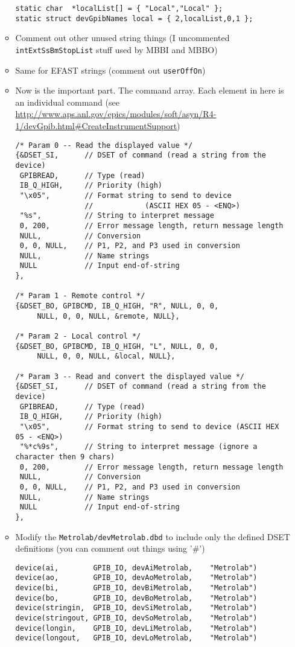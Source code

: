\documentclass[11pt]{article}
\begin{document}
\begin{enumerate}
\begin{itemize}
\begin{verbatim}
static char  *localList[] = { "Local","Local" };
static struct devGpibNames local = { 2,localList,0,1 };
\end{verbatim}
\item Comment out other unused string things (I uncommented
      \verb~intExtSsBmStopList~ stuff used by MBBI and MBBO)
\item Same for EFAST strings (comment out \verb~userOffOn~)
\item Now is the important part. The command array. Each element in
here is an individual command
(see \url{http://www.aps.anl.gov/epics/modules/soft/asyn/R4-1/devGpib.html#CreateInstrumentSupport})
\begin{verbatim}
/* Param 0 -- Read the displayed value */
{&DSET_SI,      // DSET of command (read a string from the device)
 GPIBREAD,      // Type (read)
 IB_Q_HIGH,     // Priority (high)
 "\x05",        // Format string to send to device 
                //            (ASCII HEX 05 - <ENQ>)
 "%s",          // String to interpret message
 0, 200,        // Error message length, return message length
 NULL,          // Conversion
 0, 0, NULL,    // P1, P2, and P3 used in conversion
 NULL,          // Name strings
 NULL           // Input end-of-string
},

/* Param 1 - Remote control */
{&DSET_BO, GPIBCMD, IB_Q_HIGH, "R", NULL, 0, 0, 
     NULL, 0, 0, NULL, &remote, NULL},

/* Param 2 - Local control */
{&DSET_BO, GPIBCMD, IB_Q_HIGH, "L", NULL, 0, 0, 
     NULL, 0, 0, NULL, &local, NULL},

/* Param 3 -- Read and convert the displayed value */
{&DSET_SI,      // DSET of command (read a string from the device)
 GPIBREAD,      // Type (read)
 IB_Q_HIGH,     // Priority (high)
 "\x05",        // Format string to send to device (ASCII HEX 05 - <ENQ>)
 "%*c%9s",      // String to interpret message (ignore a character then 9 chars)
 0, 200,        // Error message length, return message length
 NULL,          // Conversion
 0, 0, NULL,    // P1, P2, and P3 used in conversion
 NULL,          // Name strings
 NULL           // Input end-of-string
},
\end{verbatim}
\item Modify the \verb~Metrolab/devMetrolab.dbd~ to include only the
defined DSET definitions (you can comment out things using '\#')
\begin{verbatim}
device(ai,        GPIB_IO, devAiMetrolab,    "Metrolab")
device(ao,        GPIB_IO, devAoMetrolab,    "Metrolab")
device(bi,        GPIB_IO, devBiMetrolab,    "Metrolab")
device(bo,        GPIB_IO, devBoMetrolab,    "Metrolab")
device(stringin,  GPIB_IO, devSiMetrolab,    "Metrolab")
device(stringout, GPIB_IO, devSoMetrolab,    "Metrolab")
device(longin,    GPIB_IO, devLiMetrolab,    "Metrolab")
device(longout,   GPIB_IO, devLoMetrolab,    "Metrolab")


\end{verbatim}
\end{itemize}
\end{enumerate}
\end{document}
